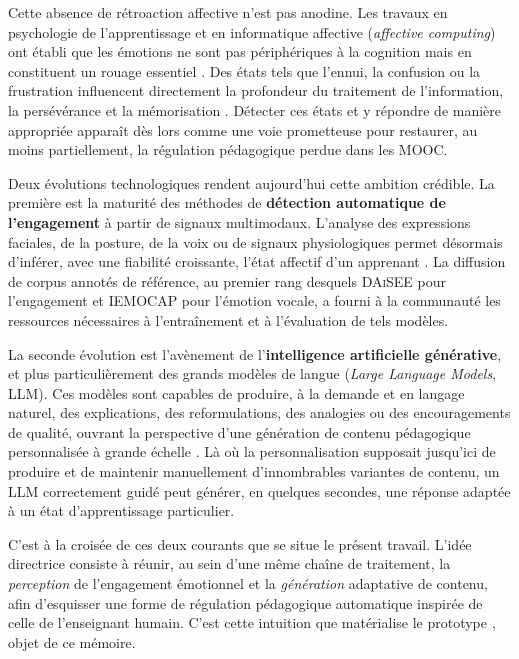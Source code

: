 Cette absence de rétroaction affective n'est pas anodine. Les travaux en
psychologie de l'apprentissage et en informatique affective
(\emph{affective computing}) ont établi que les émotions ne sont pas
périphériques à la cognition mais en constituent un rouage essentiel
\cite{picard1997affective,pekrun2006control}. Des états tels que l'ennui, la
confusion ou la frustration influencent directement la profondeur du traitement
de l'information, la persévérance et la mémorisation
\cite{dmello2012dynamics,baker2010better}. Détecter ces états et y répondre de
manière appropriée apparaît dès lors comme une voie prometteuse pour restaurer,
au moins partiellement, la régulation pédagogique perdue dans les MOOC.

Deux évolutions technologiques rendent aujourd'hui cette ambition crédible. La
première est la maturité des méthodes de \textbf{détection automatique de
l'engagement} à partir de signaux multimodaux. L'analyse des expressions
faciales, de la posture, de la voix ou de signaux physiologiques permet
désormais d'inférer, avec une fiabilité croissante, l'état affectif d'un
apprenant \cite{dmello2015review,whitehill2014faces}. La diffusion de corpus
annotés de référence, au premier rang desquels \textsc{DAiSEE}
\cite{gupta2016daisee} pour l'engagement et \textsc{IEMOCAP}
\cite{busso2008iemocap} pour l'émotion vocale, a fourni à la communauté les
ressources nécessaires à l'entraînement et à l'évaluation de tels modèles.

La seconde évolution est l'avènement de l'\textbf{intelligence artificielle
générative}, et plus particulièrement des grands modèles de langue
(\emph{Large Language Models}, LLM). Ces modèles sont capables de produire, à la
demande et en langage naturel, des explications, des reformulations, des
analogies ou des encouragements de qualité, ouvrant la perspective d'une
génération de contenu pédagogique personnalisée à grande échelle
\cite{brown2020language,kasneci2023chatgpt}. Là où la personnalisation
supposait jusqu'ici de produire et de maintenir manuellement d'innombrables
variantes de contenu, un LLM correctement guidé peut générer, en quelques
secondes, une réponse adaptée à un état d'apprentissage particulier.

C'est à la croisée de ces deux courants que se situe le présent travail. L'idée
directrice consiste à réunir, au sein d'une même chaîne de traitement, la
\emph{perception} de l'engagement émotionnel et la \emph{génération} adaptative
de contenu, afin d'esquisser une forme de régulation pédagogique automatique
inspirée de celle de l'enseignant humain. C'est cette intuition que matérialise
le prototype \emolearn{}, objet de ce mémoire.

